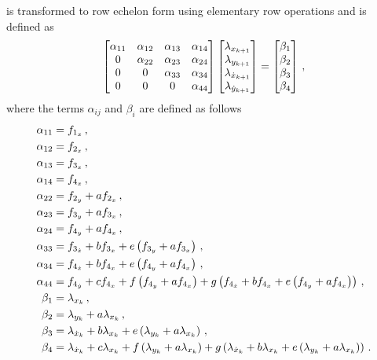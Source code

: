 \documentclass[preprint]{elsarticle}
\begin{document}
 is transformed to row echelon form using elementary row operations and is defined as
\begin{align}\label{eq:costate_ref}
	\begin{bmatrix} 
		\alpha_{11} & \alpha_{12} & \alpha_{13} & \alpha_{14} \\
		0 & \alpha_{22} & \alpha_{23} & \alpha_{24} \\
		0 & 0 & \alpha_{33} & \alpha_{34} \\
		0 & 0 & 0 & \alpha_{44}
	\end{bmatrix}
	\begin{bmatrix} \lambda_{x_{k+1}} \\ \lambda_{y_{k+1}} \\ \lambda_{\dot{x}_{k+1}} \\ \lambda_{\dot{y}_{k+1}} \end{bmatrix}
	=
	\begin{bmatrix} \beta_1 \\ \beta_2 \\ \beta_3 \\ \beta_4 \end{bmatrix} \, ,
\end{align}
where the terms \( \alpha_{ij} \) and \( \beta_{i} \) are defined as follows
\begin{subequations}
\begin{align}
	\alpha_{11} &= f_{1_x} \, ,\\
	\alpha_{12} &= f_{2_x} \, ,\\
	\alpha_{13} &= f_{3_x} \, ,\\
	\alpha_{14} &= f_{4_x} \, ,\\
	\alpha_{22} &= f_{2_y} + a f_{2_x} \, ,\\
	\alpha_{23} &= f_{3_y} + af_{3_x} \, ,\\
	\alpha_{24} &= f_{4_y} + a f_{4_x} \, ,\\
	\alpha_{33} &= f_{3_{\dot x}} + b f_{3_x} + e \left( f_{3_y} + a f_{3_x} \right)\, ,\\
	\alpha_{34} &= f_{4_{\dot x}} + b f_{4_x} + e \left( f_{4_y} + a f_{4_x} \right) \, ,\\
	\alpha_{44} &= f_{4_{\dot y}} + c f_{4_x} + f \left( f_{4_y} + a f_{4_x} \right) + g \left( f_{4_{\dot x}} + b f_{4_x} + e \left( f_{4_y} + a f_{4_x} \right) \right) \, ,\\
	\beta_1 &= \lambda_{x_k} \, ,\\
	\beta_2 &= \lambda_{y_{k}} + a \lambda_{x_k} \, ,\\
	\beta_3 &= \lambda_{\dot{x}_{k}} + b \lambda_{x_k} + e \left( \lambda_{y_{k}} + a \lambda_{x_k} \right) \, ,\\
	\beta_4 &= \lambda_{\dot{x}_{k}} + c \lambda_{x_k} + f \left( \lambda_{y_{k}}+a \lambda_{x_k} \right) + g \left( \lambda_{\dot{x}_{k}} + b \lambda_{x_k} + e \left( \lambda_{y_{k}} + a \lambda_{x_k} \right) \right) \, .
\end{align}
\end{subequations}
\end{document}
